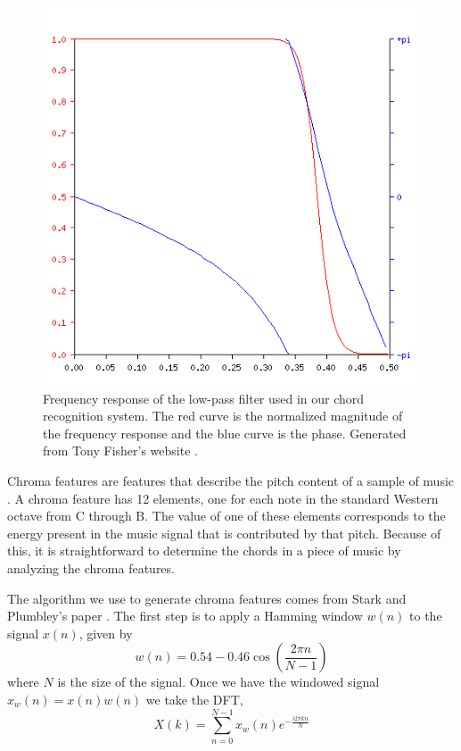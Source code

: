\documentclass[journal]{IEEEtran}
\begin{document}
\begin{figure}[t]
    \centering
    \includegraphics[width=\linewidth]{../Figures/frequency_response}
    \caption{Frequency response of the low-pass filter used in our chord recognition system.
    The red curve is the normalized magnitude of the frequency response and the blue curve is the phase.
    Generated from Tony Fisher's website \cite{filter}.}
    \label{fig:frequency_response}
\end{figure}

Chroma features are features that describe the pitch content of a sample of music \cite{jiang}.
A chroma feature has 12 elements, one for each note in the standard Western octave from C through B.
The value of one of these elements corresponds to the energy present in the music signal that is contributed by that pitch.
Because of this, it is straightforward to determine the chords in a piece of music by analyzing the chroma features.

The algorithm we use to generate chroma features comes from Stark and Plumbley’s paper \cite{stark}.
The first step is to apply a Hamming window $w(n)$ to the signal $x(n)$, given by
\begin{equation}
    w(n) = 0.54 - 0.46\cos\!\left(\frac{2\pi n}{N - 1}\right)
    \label{eq:window}
\end{equation}
where $N$ is the size of the signal.
Once we have the windowed signal $x_w(n) = x(n)w(n)$ we take the DFT,
\begin{equation}
    X(k) = \sum_{n = 0}^{N - 1}x_w(n)e^{-\frac{i2\pi kn}{N}}
    \label{eq:dft}
\end{equation}
\end{document}
